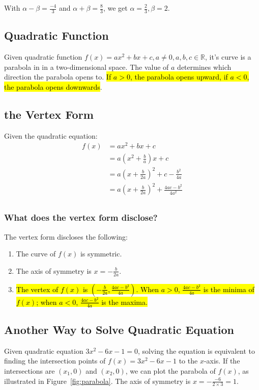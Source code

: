 \documentclass[11pt, oneside]{article}   	%
\begin{document}
With $\alpha - \beta = \frac{-4}{3}$ and $\alpha + \beta = \frac{8}{3}$, we get $\alpha = \frac{2}{3}, \beta = 2$. 



\subsection{Quadratic Function} 
Given quadratic function $f(x)=ax^2+bx+c, a\ne 0, a, b, c \in\mathbb{R}$, it's curve is a parabola in in a two-dimensional space. The value of $a$ determines which direction the parabola opens to. \hl{If $a>0$, the parabola opens upward, if $a<0$, the parabola opens downwards}. 

\subsection{the Vertex Form} 

Given the quadratic equation: 
\begin{align*}
f(x) &=ax^2+bx+c\\
& =a\left(x^2+\frac{b}{a}\right)x+c\\
& =a\left(x+\frac{b}{2a}\right)^2+c-\frac{b^2}{4a}\\
& =a\left(x+\frac{b}{2a}\right)^2+\frac{4ac-b^2}{4a^2}\\
\end{align*}

\subsubsection{What does the vertex form disclose? }
The vertex form discloses the following:
\begin{enumerate}
\item The curve of $f(x)$ is symmetric.

\item The axis of symmetry is $x=-\frac{b}{2a}$. 

\item \hl{The vertex of $f(x)$ is $(-\frac{b}{2a}, \frac{4ac-b^2}{4a})$. When $a>0$, $\frac{4ac-b^2}{4a}$ is the minima of $f
(x)$; when $a<0$, $\frac{4ac-b^2}{4a}$ is the maxima. }

\end{enumerate} 

\subsection{Another Way to Solve Quadratic Equation}
Given quadratic equation  $3x^2-6x-1=0$, solving the equation is equivalent to finding the intersection points of $f(x) =3x^2 -6x -1$ to the $x$-axis. If the intersections are $(x_1, 0)$ and $(x_2, 0)$, we can plot the parabola  of $f(x)$, as illustrated in Figure~\ref{fig:parabola}. The axis of symmetry is $x = -\frac{-6}{2\times 3} = 1$. 
\end{document}

